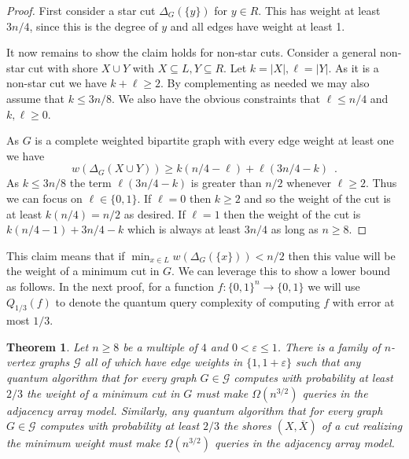 \documentclass[10pt,a4paper]{article}
\newcommand{\Gcal}{\mathcal{G}}
\newcommand{\1}{\mathbf{1}}
\newtheorem{theorem}{Theorem}
\theoremstyle{definition}
\begin{document}
\begin{proof}
First consider a star cut $\Delta_G(\{y\})$ for $y \in R$.  This has weight at least $3n/4$, since this is the degree of $y$ and all edges have weight at least 1.  

It now remains to show the claim holds for non-star cuts.  Consider a general non-star cut with shore $X \cup Y$ with $X \subseteq L, Y \subseteq R$.  Let 
$k = |X|, \ell = |Y|$.  As it is a non-star cut we have $k + \ell \ge 2$.  By complementing as needed we may also assume that $k \le 3n/8$.  We also have 
the obvious constraints that $\ell \le n/4$ and $k,\ell \ge 0$.  

As $G$ is a complete weighted bipartite graph with every edge weight at least one we have
\[
w(\Delta_G(X \cup Y)) \ge k(n/4-\ell) + \ell(3n/4-k) \enspace .
\]
As $k \le 3n/8$ the term $\ell (3n/4-k)$ is greater than $n/2$ whenever $\ell \ge 2$.  Thus we can focus on $\ell \in \{0,1\}$.  
If $\ell=0$ then $k\ge 2$ and so the weight of the cut is at least $k(n/4)=n/2$ as desired.  If $\ell = 1$ then the weight of the 
cut is $k(n/4-1) + 3n/4-k$ which is always at least $3n/4$ as long as $n \ge 8$.  
\end{proof}

This claim means that if $\min_{x \in L} w(\Delta_G(\{x\})) < n/2$ then this value will be the weight of a minimum cut in $G$.  
We can leverage this to show a lower bound as follows.
In the next proof, for a function $f: \{0,1\}^n \rightarrow \{0,1\}$ we will use $Q_{1/3}(f)$ to denote the quantum query complexity of computing $f$ with error at most $1/3$.

\begin{theorem}
\label{thm:adjlower2}
Let $n \ge 8$ be a multiple of $4$ and $0 < \varepsilon \le 1$.  There is a family of $n$-vertex graphs $\Gcal$ all of which have edge weights in $\{1,1+\varepsilon\}$ 
such that any quantum algorithm that for every graph $G \in \Gcal$ computes with probability at least $2/3$ the weight of a minimum cut in $G$ must make 
$\Omega(n^{3/2})$ queries in the adjacency array model.  Similarly, any quantum algorithm that for every graph $G \in \Gcal$ computes with 
probability at least $2/3$ the shores $(X,\overline{X})$ of a cut realizing the minimum weight must make $\Omega(n^{3/2})$ queries in the adjacency array model.
\end{theorem}
\end{document}

